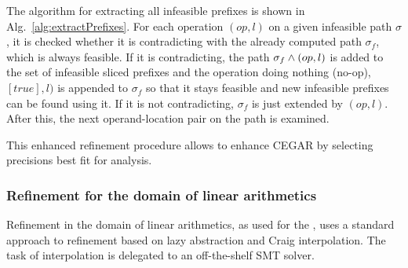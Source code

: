 The algorithm for extracting all infeasible prefixes is shown in Alg.~\ref{alg:extractPrefixes}.
For each operation $(op, l)$ on a given infeasible path $\sigma$, it is checked whether it is contradicting with the already computed path $\sigma_f$, which is always feasible.
If it is contradicting, the path $\sigma_f \wedge (op, l)$ is added to the set of infeasible sliced prefixes
and the operation doing nothing (no-op), $[true], l)$ is appended to $\sigma_f$ so that it stays feasible and new infeasible prefixes can be found using it.
If it is not contradicting, $\sigma_f$ is just extended by $(op, l)$.
After this, the next operand-location pair on the path is examined.

This enhanced refinement procedure allows to enhance CEGAR by selecting precisions best fit for analysis.

\subsubsection*{Refinement for the domain of linear arithmetics}
Refinement in the domain of linear arithmetics, as used for the \predicateCPA, uses a standard approach to refinement based on lazy abstraction and Craig interpolation.
The task of interpolation is delegated to an off-the-shelf SMT solver.


